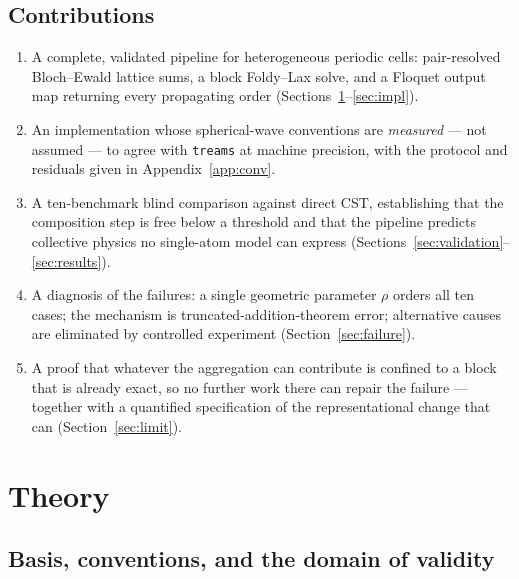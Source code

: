 \documentclass[11pt,a4paper]{article}
\theoremstyle{plain}
\theoremstyle{definition}
\begin{document}
\subsection{Contributions}

\begin{enumerate}[leftmargin=*,itemsep=2pt]
\item A complete, validated pipeline for heterogeneous periodic cells:
      pair-resolved Bloch--Ewald lattice sums, a block Foldy--Lax solve, and a
      Floquet output map returning every propagating order
      (Sections~\ref{sec:theory}--\ref{sec:impl}).
\item An implementation whose spherical-wave conventions are \emph{measured} ---
      not assumed --- to agree with \texttt{treams} at machine precision, with the
      protocol and residuals given in Appendix~\ref{app:conv}.
\item A ten-benchmark blind comparison against direct CST, establishing that the
      composition step is free below a threshold and that the pipeline predicts
      collective physics no single-atom model can express
      (Sections~\ref{sec:validation}--\ref{sec:results}).
\item A diagnosis of the failures: a single geometric parameter $\rho$ orders all
      ten cases; the mechanism is truncated-addition-theorem error; alternative
      causes are eliminated by controlled experiment (Section~\ref{sec:failure}).
\item A proof that whatever the aggregation can contribute is confined to a block
      that is already exact, so no further work there can repair the failure ---
      together with a quantified specification of the representational change
      that can (Section~\ref{sec:limit}).
\end{enumerate}

\section{Theory}
\label{sec:theory}

\subsection{Basis, conventions, and the domain of validity}
\end{document}
